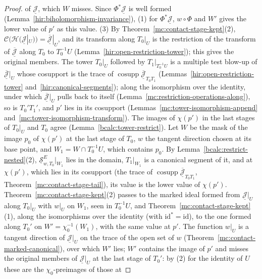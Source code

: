 \begin{proof}
of \(\underline{\mathcal J}\), which \(W\) misses. Since \(\Phi^*\underline{\mathcal J}\) is well formed (Lemma~\ref{hir:biholomorphism-invariance}), (1) for \(\Phi^*\underline{\mathcal J}\),
\(w\circ\Phi\) and \(W'\) gives the lower value of \(p'\) as this value.
(3) By Theorem~\ref{mc:contact-stage-kept}(2), \(\mathcal C(\mathcal H(\underline{\mathcal J}|_U))=\overline{\underline{\mathcal J}}|_U\), and its transform along \(T_0|_U\) is the
restriction of the transform of \(\overline{\underline{\mathcal J}}\) along \(T_0\) to \(T_0^{-1}U\) (Lemma~\ref{hir:open-restriction-tower}); this gives the original members.
The tower \(T_0|_U\) followed by \(T_1|_{T_0^{-1}U}\) is a multiple test blow-up of \(\overline{\underline{\mathcal J}}|_U\) whose cosupport is the trace of
\(\operatorname{cosupp}\overline{\underline{\mathcal J}}_{T_0T_1}\) (Lemmas~\ref{hir:open-restriction-tower} and~\ref{hir:canonical-segments}); along the isomorphism over the
identity, under which \(\overline{\underline{\mathcal J}}|_U\) pulls back to itself (Lemma~\ref{mc:restriction-operations-along}), so is \(T_0'T_1'\), and \(p'\) lies in its
cosupport (Lemmas~\ref{mc:tower-isomorphism-append} and~\ref{mc:tower-isomorphism-transform}). The images of \(\chi(p')\) in the last stages of \(T_0|_U\) and \(T_0\) agree
(Lemma~\ref{bcalc:tower-restrict}). Let \(W\) be the mask of the image \(p_0\) of \(\chi(p')\) at the last stage of \(T_0\), \(w\) the tangent direction chosen at its base
point, and \(W_1=W\cap T_0^{-1}U\), which contains \(p_0\). By Lemma~\ref{bcalc:restrict-nested}(2), \(\underline{\mathcal S}^E_{w,T_0}|_{W_1}\) lies in the domain, \(T_1|_{W_1}\)
is a canonical segment of it, and at \(\chi(p')\), which lies in its cosupport (the trace of \(\operatorname{cosupp}\overline{\underline{\mathcal J}}_{T_0T_1}\),
Theorem~\ref{mc:contact-stage-tail}), its value is the lower value of \(\chi(p')\). Theorem~\ref{mc:contact-stage-kept}(2) passes to the marked ideal formed from
\(\underline{\mathcal J}|_U\) along \(T_0|_U\) with \(w|_U\) on \(W_1\), seen in \(T_0^{-1}U\), and Theorem~\ref{mc:contact-stage-kept}(1), along the isomorphisms over the identity
(with \(\mathrm{id}^*=\mathrm{id}\)), to the one formed along \(T_0'\) on \(W'=\chi_0^{-1}(W_1)\), with the same value at \(p'\). The function \(w|_U\) is a tangent direction of
\(\underline{\mathcal J}|_U\) on the trace of the open set of \(w\) (Theorem~\ref{mc:contact-marked-canonical}), over which \(W'\) lies; \(W'\) contains the image of \(p'\) and
misses the original members of \(\underline{\mathcal J}|_U\) at the last stage of \(T_0'\): by (2) for the identity of \(U\) these are the \(\chi_0\)-preimages of those at

\end{proof}
